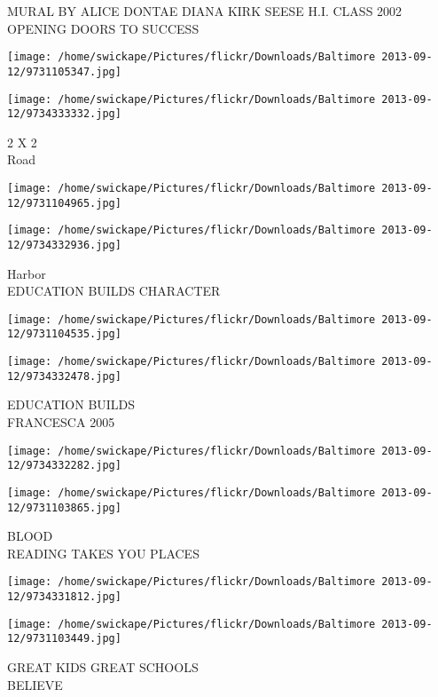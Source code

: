 \documentclass[10pt,letterpaper]{article}
\begin{document}
MURAL BY ALICE DONTAE DIANA KIRK SEESE H.I. CLASS 2002\\
OPENING DOORS TO SUCCESS
\pagebreak

\texttt{[image: /home/swickape/Pictures/flickr/Downloads/Baltimore 2013-09-12/9731105347.jpg]}

\vspace{0.25in}
\texttt{[image: /home/swickape/Pictures/flickr/Downloads/Baltimore 2013-09-12/9734333332.jpg]}

2 X 2\\
Road
\pagebreak

\texttt{[image: /home/swickape/Pictures/flickr/Downloads/Baltimore 2013-09-12/9731104965.jpg]}

\vspace{0.25in}
\texttt{[image: /home/swickape/Pictures/flickr/Downloads/Baltimore 2013-09-12/9734332936.jpg]}

Harbor\\
EDUCATION BUILDS CHARACTER
\pagebreak

\texttt{[image: /home/swickape/Pictures/flickr/Downloads/Baltimore 2013-09-12/9731104535.jpg]}

\vspace{0.25in}
\texttt{[image: /home/swickape/Pictures/flickr/Downloads/Baltimore 2013-09-12/9734332478.jpg]}

EDUCATION BUILDS\\
FRANCESCA 2005
\pagebreak

\texttt{[image: /home/swickape/Pictures/flickr/Downloads/Baltimore 2013-09-12/9734332282.jpg]}

\vspace{0.25in}
\texttt{[image: /home/swickape/Pictures/flickr/Downloads/Baltimore 2013-09-12/9731103865.jpg]}

BLOOD\\
READING TAKES YOU PLACES
\pagebreak

\texttt{[image: /home/swickape/Pictures/flickr/Downloads/Baltimore 2013-09-12/9734331812.jpg]}

\vspace{0.25in}
\texttt{[image: /home/swickape/Pictures/flickr/Downloads/Baltimore 2013-09-12/9731103449.jpg]}

GREAT KIDS GREAT SCHOOLS\\
BELIEVE
\pagebreak
\end{document}
